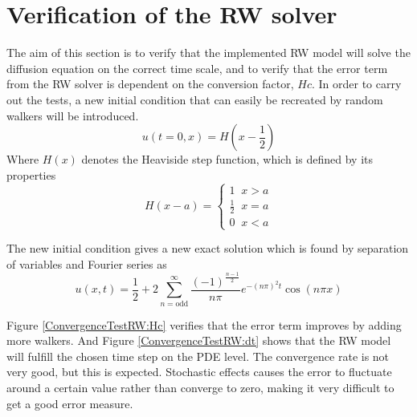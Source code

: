 \section{Verification of the RW solver}

The aim of this section is to verify that the implemented RW model will solve the diffusion equation on the correct time scale, and to verify that the error term from the RW solver is dependent on the conversion factor, $Hc$. 
In order to carry out the tests, a new initial condition that can easily be recreated by random walkers will be introduced.
\begin{equation}
 u(t=0,x) = H\left(x-\frac{1}{2}\right)
\end{equation}
\noindent Where $H(x)$ denotes the Heaviside step function, which is defined by its properties
\begin{equation}\label{Heaviside_def}
 H(x-a) = \begin{cases}
           1\;\;x > a\\
           \frac{1}{2}\;\; x = a\\ 
           0\;\;x < a
          \end{cases}
\end{equation}

\noindent The new initial condition gives a new exact solution which is found by separation of variables and Fourier series as 
\begin{equation}
 u(x,t) = \frac{1}{2} + 2\sum\limits_{n= \text{odd}}^\infty \frac{(-1)^{\frac{n-1}{2}}}{n\pi}e^{-(n\pi)^2t}\cos(n\pi x)
\end{equation}

\noindent Figure \ref{ConvergenceTestRW:Hc} verifies that the error term improves by adding more walkers. And Figure \ref{ConvergenceTestRW:dt} shows that the RW model will fulfill the chosen time step on the PDE level. 
The convergence rate is not very good, but this is expected. 
Stochastic effects causes the error to fluctuate around a certain value rather than converge to zero, making it very difficult to get a good error measure.

